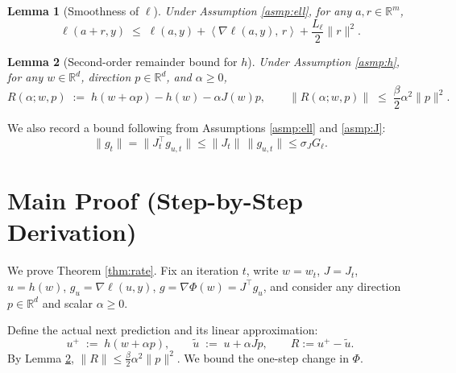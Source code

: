 \documentclass[11pt]{article}
\newtheorem{lemma}{Lemma}
\newcommand{\R}{\mathbb{R}}
\newcommand{\inner}[2]{\left\langle #1,\, #2 \right\rangle}
\begin{document}
\begin{lemma}[Smoothness of $\ell$]\label{lem:ell_smooth}
Under Assumption \ref{asmp:ell}, for any $a,r\in\R^m$,
\[
\ell(a+r,y) \;\le\; \ell(a,y) + \inner{\nabla \ell(a,y)}{r} + \frac{L_\ell}{2}\|r\|^2.
\]
\end{lemma}

\begin{lemma}[Second-order remainder bound for $h$]\label{lem:h_remainder}
Under Assumption \ref{asmp:h}, for any $w\in\R^d$, direction $p\in\R^d$, and $\alpha\ge 0$,
\[
R(\alpha;w,p) \;:=\; h(w+\alpha p)-h(w)-\alpha J(w)p,\qquad \|R(\alpha;w,p)\| \;\le\; \frac{\beta}{2}\alpha^2\|p\|^2.
\]
\end{lemma}

\noindent We also record a bound following from Assumptions \ref{asmp:ell} and \ref{asmp:J}:
\begin{equation}\label{eq:gw_bound}
\|g_t\| = \|J_t^\top g_{u,t}\| \le \|J_t\|\,\|g_{u,t}\| \le \sigma_J G_\ell.
\end{equation}

\section*{Main Proof (Step-by-Step Derivation)}
We prove Theorem \ref{thm:rate}. Fix an iteration $t$, write $w=w_t$, $J=J_t$, $u=h(w)$, $g_u=\nabla\ell(u,y)$, $g=\nabla\Phi(w)=J^\top g_u$, and consider any direction $p\in\R^d$ and scalar $\alpha\ge 0$.

Define the actual next prediction and its linear approximation:
\[
u^+ \;:=\; h(w+\alpha p),\qquad \tilde{u} \;:=\; u + \alpha J p,\qquad R := u^+ - \tilde{u}.
\]
By Lemma \ref{lem:h_remainder}, $\|R\| \le \frac{\beta}{2}\alpha^2\|p\|^2$. We bound the one-step change in $\Phi$.
\end{document}
